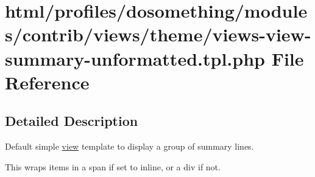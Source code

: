 \hypertarget{views-view-summary-unformatted_8tpl_8php}{
\section{html/profiles/dosomething/modules/contrib/views/theme/views-\/view-\/summary-\/unformatted.tpl.php File Reference}
\label{views-view-summary-unformatted_8tpl_8php}
}


\subsection{Detailed Description}
Default simple \hyperlink{classview}{view} template to display a group of summary lines.

This wraps items in a span if set to inline, or a div if not. 